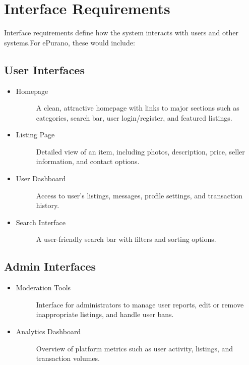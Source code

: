 \section{Interface Requirements}
Interface requirements define how the system interacts with users and other systems.For ePurano, these would include:

\subsection{User Interfaces}
\begin{itemize}
    \item \begin{description}
        \item[Homepage] A clean, attractive homepage with links to major sections such as categories, search bar, user login/register, and featured listings.
    \end{description}
    \item \begin{description}
        \item[Listing Page] Detailed view of an item, including photos, description, price, seller information, and contact options.
    \end{description}
    \item \begin{description}
        \item[User Dashboard] Access to user's listings, messages, profile settings, and transaction history.
    \end{description}
    \item \begin{description}
        \item[Search Interface] A user-friendly search bar with filters and sorting options.
    \end{description}
\end{itemize} 

\subsection{Admin Interfaces}
\begin{itemize}
    \item \begin{description}
        \item[Moderation Tools] Interface for administrators to manage user reports, edit or remove inappropriate listings, and handle user bans.
    \end{description}
    \item \begin{description}
        \item[Analytics Dashboard] Overview of platform metrics such as user activity, listings, and transaction volumes.
    \end{description}
\end{itemize} 

